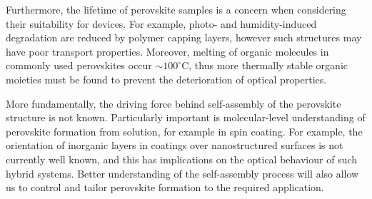 Furthermore, the lifetime of perovskite samples is a concern when considering their suitability for devices. For example, photo- and humidity-induced degradation are reduced by polymer capping layers, however such structures may have poor transport properties. Moreover, melting of organic molecules in commonly used perovskites occur $\sim100^{\circ}$C, thus more thermally stable organic moieties must be found to prevent the deterioration of optical properties. 

More fundamentally, the driving force behind self-assembly of the perovskite structure is not known. Particularly important is molecular-level understanding of perovskite formation from solution, for example in spin coating. For example, the orientation of inorganic layers in coatings over nanostructured surfaces is not currently well known, and this has implications on the optical behaviour of such hybrid systems. Better understanding of the self-assembly process will also allow us to control and tailor perovskite formation to the required application.